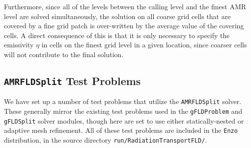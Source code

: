 \documentclass[letterpaper,10pt]{article}
\renewcommand{\(}{\left(}
\renewcommand{\)}{\right)}
\newcommand{\enzo}{{\tt Enzo} }
\begin{document}
Furthermore, since all of the levels between the calling level and the
finest AMR level are solved simultaneously, the solution on all coarse
grid cells that are covered by a fine grid patch is over-written by
the average value of the covering cells.  A direct consequence of this
is that it is only necessary to specify the emissivity $\eta$ in cells
on the finest grid level in a given location, since coarser cells will
not contribute to the final solution.




\subsection{{\tt AMRFLDSplit} Test Problems}
\label{sec:AMRFLDSplit_test_problems}

We have set up a number of test problems that utilize the 
{\tt AMRFLDSplit} solver.  These generally mirror the existing test
problems used in the {\tt gFLDProblem} and {\tt gFLDSplit} solver
modules, though here are set to use either statically-nested or
adaptive mesh refinement.  All of these test problems are included in
the \enzo distribution, in the source directory 
{\tt run/RadiationTransportFLD/}. 
\end{document}
